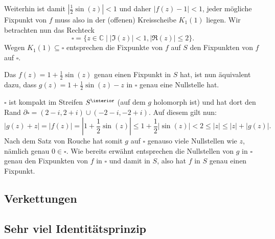\documentclass[a4paper]{article}
\begin{document}
Weiterhin ist damit $|\frac{1}{2} \sin(z)| < 1$ und daher $|f(z) - 1| < 1$, jeder mögliche Fixpunkt von $f$ muss also in der (offenen) Kreisscheibe $K_1(1)$ liegen.
Wir betrachten nun das Rechteck
\begin{equation*}
	\square = \{ z \in \mathds{C} \mid |\Im(z)|< 1, |\Re(z)| \leq 2\}\text{.}
\end{equation*}
Wegen $K_1(1) \subseteq \square$ entsprechen die Fixpunkte von $f$ auf $S$ den Fixpunkten von $f$ auf $\square$.

Das $f(z) = 1 + \frac{1}{2} \sin(z)$ genau einen Fixpunkt in $S$ hat, ist nun äquivalent dazu, dass $g(z) = 1 + \frac{1}{2} \sin(z) - z$ in $\square$ genau eine Nullstelle hat.


$\square$ ist kompakt im Streifen $S^\interior$ (auf dem $g$ holomorph ist) und hat dort den Rand $\partial \square = (2 - i, 2 + i) \cup (-2 - i, -2 + i)$. Auf diesem gilt nun:
\begin{equation*}
	|g(z) + z| = |f(z)| = |1 + \frac{1}{2} \sin(z)| \leq 1 + \frac{1}{2} | \sin(z)| < 2  \leq |z| \leq |z| + |g(z)|\text{.}
\end{equation*}
Nach dem Satz von Rouche hat somit $g$ auf $\square$ genauso viele Nullstellen wie $z$, nämlich genau $0 \in \square$.
Wie bereits erwähnt entsprechen die Nullstellen von $g$ in $\square$ genau den Fixpunkten von $f$ in $\square$ und damit in $S$, also hat $f$ in $S$ genau einen Fixpunkt.

\subsection{Verkettungen}



\subsection{Sehr viel Identitätsprinzip}
\end{document}
